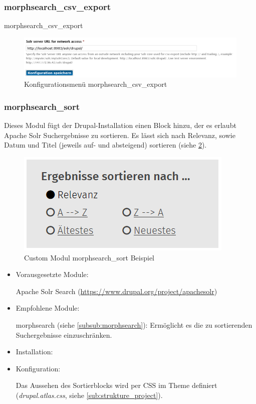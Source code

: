 \subsubsection{morphsearch\_csv\_export}\label{subsub:morphsearchcsv}
morphsearch\_csv\_export
\begin{figure}[H]
	\centering
	\includegraphics[width=0.70\linewidth]{images/config_searchcsv}
	\caption{Konfigurationsmenü morphsearch\_csv\_export}
	\label{fig:config_search}
\end{figure}



\newpage
\subsubsection{morphsearch\_sort}\label{subsub:morphsearchsort}
Dieses Modul fügt der Drupal-Installation einen Block hinzu, der es erlaubt Apache Solr Suchergebnisse zu sortieren. Es lässt sich nach Relevanz, sowie Datum und Titel (jeweils auf- und absteigend) sortieren (siehe \cref{fig:example_morphsearchsort}).


\begin{figure}[H]
	\centering
	\includegraphics[height=0.10\textheight]{images/example_morphsearchsort}
	\caption{Custom Modul morphsearch\_sort Beispiel}
	\label{fig:example_morphsearchsort}
\end{figure}

\begin{itemize}[parsep=0pt, itemsep=5.0pt plus 2.0pt minus 1.0pt, leftmargin=*]
	\item Vorausgesetzte Module:

	Apache Solr Search (\url{https://www.drupal.org/project/apachesolr})


	\item Empfohlene Module:

	morphsearch (siehe \cref{subsub:morphsearch}): Ermöglicht es die zu sortierenden Suchergebnisse einzuschränken.


	\item Installation: \standardinstall

	\item Konfiguration:

	\noconfig

	Das Aussehen des Sortierblocks wird per CSS im Theme definiert (\zB \textit{drupal.atlas.css}, siehe \cref{sub:strukture_project}).

\end{itemize}


